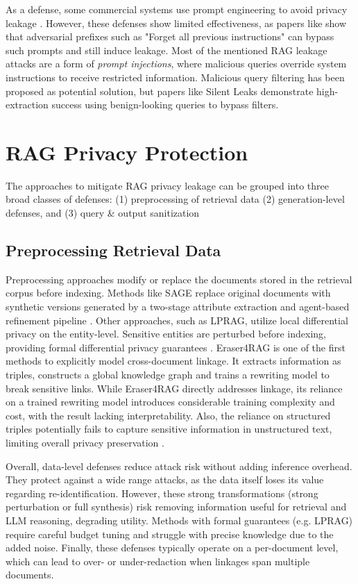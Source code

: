 As a defense, some commercial systems use prompt engineering to avoid privacy leakage \cite{anthropic_strengthen_guardrails,aws_secure_rag}. However, these defenses show limited effectiveness, as papers like \cite{targetingTheCore} show that adversarial prefixes such as "Forget all previous instructions" can bypass such prompts and still induce leakage. Most of the mentioned RAG leakage attacks are a form of \textit{prompt injections}, where malicious queries override system instructions to receive restricted information. Malicious query filtering has been proposed as potential solution, but papers like Silent Leaks \cite{silentLeaks} demonstrate high-extraction success using benign-looking queries to bypass filters.


\section{RAG Privacy Protection}
The approaches to mitigate RAG privacy leakage can be grouped into three broad classes of defenses: (1) preprocessing of retrieval data (2) generation-level defenses, and (3) query \& output sanitization

\subsection{Preprocessing Retrieval Data} 
Preprocessing approaches modify or replace the documents stored in the retrieval corpus before indexing. Methods like \ac{SAGE} replace original documents with synthetic versions generated by a two-stage attribute extraction and agent-based refinement pipeline \cite{ragSAGE}. Other approaches, such as LPRAG, utilize local differential privacy on the entity-level. Sensitive entities are perturbed before indexing, providing formal differential privacy guarantees \cite{LPRAG}. Eraser4RAG is one of the first methods to explicitly model cross-document linkage. It extracts information as triples, constructs a global knowledge graph and trains a rewriting model to break sensitive links. While Eraser4RAG directly addresses linkage, its reliance on a trained rewriting model introduces considerable training complexity and cost, with the result lacking interpretability. Also, the reliance on structured triples potentially fails to capture sensitive information in unstructured text, limiting overall privacy preservation \cite{eraser4RAG}. 

Overall, data-level defenses reduce attack risk without adding inference overhead. They protect against a wide range attacks, as the data itself loses its value regarding re-identification. However, these strong transformations (strong perturbation or full synthesis) risk removing information useful for retrieval and LLM reasoning, degrading utility. Methods with formal guarantees (e.g. LPRAG) require careful budget tuning and struggle with precise knowledge due to the added noise. Finally, these defenses typically operate on a per-document level, which can lead to over- or under-redaction when linkages span multiple documents.



